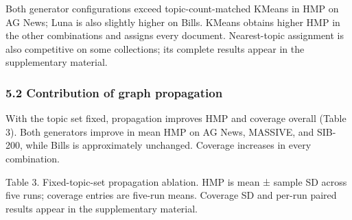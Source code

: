 \documentclass[
  11pt,
  a4paper,
]{article}
\begin{document}
Both generator configurations exceed topic-count-matched KMeans in HMP
on AG News; Luna is also slightly higher on Bills. KMeans obtains higher
HMP in the other combinations and assigns every document. Nearest-topic
assignment is also competitive on some collections; its complete results
appear in the supplementary material.

\subsubsection{5.2 Contribution of graph
propagation}\label{contribution-of-graph-propagation}

With the topic set fixed, propagation improves HMP and coverage overall
(Table 3). Both generators improve in mean HMP on AG News, MASSIVE, and
SIB-200, while Bills is approximately unchanged. Coverage increases in
every combination.


Table 3. Fixed-topic-set propagation ablation. HMP is mean ± sample SD
across five runs; coverage entries are five-run means. Coverage SD and
per-run paired results appear in the supplementary material.
\end{document}
